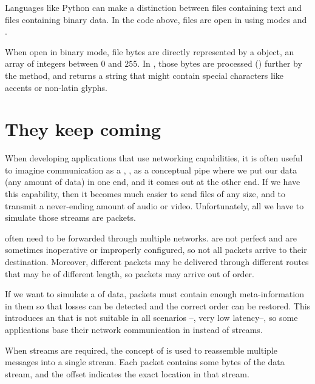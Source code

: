 \begin{remark}
Languages like Python can make a distinction between files containing text and files containing binary data.
In the code above, files are open in  using modes  and .

When open in binary mode, file bytes are directly represented by a  object, an array of 
integers between $0$ and $255$. In , those bytes are processed () further by the  method,
and returns a string that might contain special characters like accents or non-latin glyphs. 
\end{remark}

\section{They keep coming}\label{sec:packets:stream}

When developing applications that use networking capabilities, it is often useful 
to imagine communication as a , \ie, as a conceptual pipe where we put 
our data (any amount of data) in one end, and it comes out at the other end. If we have
this capability, then it becomes much easier to send files of any size, and to transmit a never-ending
amount of audio or video. Unfortunately, all we have to simulate those streams are packets.

 often need to be forwarded through multiple networks.  are not perfect
and are sometimes inoperative or improperly configured, so not all packets arrive to their destination. Moreover,
different packets may be delivered through different routes that may be of different length, so packets may arrive
out of order.

If we want to simulate a  of data, packets must contain enough meta-information in them so that losses can be detected and 
the correct order can be restored. This introduces an  that is not suitable in all scenarios --\eg, very low latency--,
so some applications base their network communication in  instead of streams.

When streams are required, the concept of  is used to reassemble multiple messages into 
a single stream. Each packet contains some bytes of the data stream, and the offset indicates the exact location in that stream.

